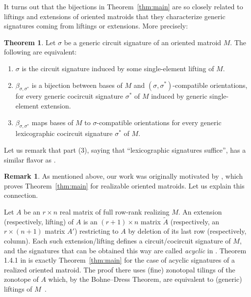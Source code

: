 \documentclass[12pt]{amsart}
\numberwithin{equation}{section}
\theoremstyle{definition}
\newcounter{mainTheorem}
\newtheorem{maintheorem}[mainTheorem]{Theorem}
\newtheorem{remark}[theorem]{Remark}
\newcommand{\chiho}[1]{\todo[color=green!30]{\rm #1 \\ \hfill --- Ch.}}
\begin{document}
It turns out that the bijections in Theorem~\ref{thm:main} are so closely related to liftings and extensions of oriented matroids that they characterize generic signatures coming from liftings or extensions. More precisely:

\begin{maintheorem} 
\label{thm:characterization}
Let $\sigma$ be a generic circuit signature of an oriented matroid $M$.
The following are equivalent:
\begin{enumerate}
\item $\sigma$ is the circuit signature induced by some single-element lifting of $M$.
\item $\beta_{\sigma,\sigma^*}$ is a bijection between bases of ${M}$ and $(\sigma,\sigma^*)$-compatible orientations, for every generic cocircuit signature $\sigma^*$ of $M$ induced by generic single-element extension.
\item $\beta_{\sigma,\sigma^*}$ maps bases of $M$ to $\sigma$-compatible orientations for every generic lexicographic cocircuit signature $\sigma^*$ of $M$.
\end{enumerate}
\end{maintheorem}

Let us remark that part (3), saying that  ``lexicographic signatures suffice'', has a similar flavor as \cite[Theorem~3.5]{Santos_book}.

\begin{remark} \label{rem:acyclic}
    As mentioned above, our work was originally motivated by \cite{BBY}, which proves Theorem~\ref{thm:main} for realizable oriented matroids. Let us explain this connection.
    
    Let $A$ be an $r\times n$ real matrix of full row-rank realizing $M$. An extension (respectively, lifting) of $A$ is an $(r+1)\times n$ matrix $\widetilde A$ (respectively, an $r\times (n+1)$ matrix $A'$) restricting to $A$ by deletion of its last row (respectively, column). Each such extension/lifting defines a circuit/cocircuit signature of $M$, and the signatures that can be obtained this way are called \emph{acyclic} in \cite{BBY}.
    Theorem 1.4.1 in \cite{BBY} is exactly Theorem~\ref{thm:main} for the case of acyclic signatures of a realized oriented matroid. The proof there uses (fine) zonotopal tilings
    of the zonotope of $A$ which, by the Bohne--Dress Theorem, are equivalent to (generic) liftings of $M$~\cite{Bohne_thesis, RZ_BD_thm}. 
\end{remark}
\end{document}
